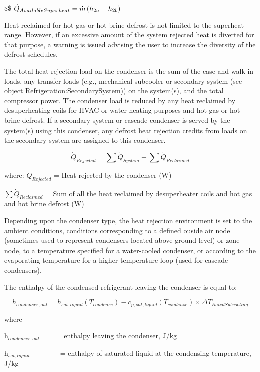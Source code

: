 \$\$ \({\dot Q_{AvailableSuperheat}} = \dot m\left( {{h_{{\rm{2}}a}} - {h_{2b}}} \right)\)

Heat reclaimed for hot gas or hot brine defrost is not limited to the superheat range. However, if an excessive amount of the system rejected heat is diverted for that purpose, a warning is issued advising the user to increase the diversity of the defrost schedules.

The total heat rejection load on the condenser is the sum of the case and walk-in loads, any transfer loads (e.g., mechanical subcooler or secondary system (see object Refrigeration:SecondarySystem)) on the system(s), and the total compressor power. The condenser load is reduced by any heat reclaimed by desuperheating coils for HVAC or water heating purposes and hot gas or hot brine defrost. If a secondary system or cascade condenser is served by the system(s) using this condenser, any defrost heat rejection credits from loads on the secondary system are assigned to this condenser.

\begin{equation}
{\dot Q_{Rejected}} = \sum {{{\dot Q}_{System}}}  - \sum {{{\dot Q}_{Reclaimed}}}
\end{equation}

where: \(\dot{Q}_{Rejected}\) = Heat rejected by the condenser (W)

\(\sum {{{\dot Q}_{Reclaimed}}}\) = Sum of all the heat reclaimed by desuperheater coils and hot gas and hot brine defrost (W)

Depending upon the condenser type, the heat rejection environment is set to the ambient conditions, conditions corresponding to a defined ouside air node (sometimes used to represent condensers located above ground level) or zone node, to a temperature specified for a water-cooled condenser, or according to the evaporating temperature for a higher-temperature loop (used for cascade condensers).

The enthalpy of the condensed refrigerant leaving the condenser is equal to:

\begin{equation}
{h_{condenser,out}} = {h_{sat,liquid}}({T_{condense}}) - {c_{p,sat,liquid}}({T_{condense}}) \times \Delta {T_{RatedSubcooling}}
\end{equation}

where

h\(_{condenser,out}\)~~~~ = enthalpy leaving the condenser, J/kg

h\(_{sat,liquid}\)~~~~~~~~ = enthalpy of saturated liquid at the condensing temperature, J/kg

